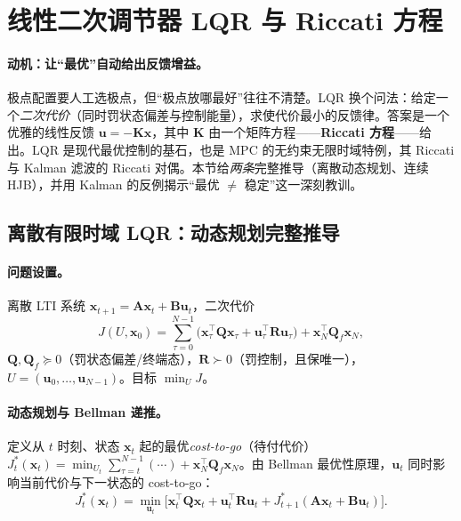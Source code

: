 \section{线性二次调节器 LQR 与 Riccati 方程}
\label{sec:ctrl-lqr}

\paragraph{动机：让“最优”自动给出反馈增益。}
极点配置要人工选极点，但“极点放哪最好”往往不清楚。LQR 换个问法：给定一个\emph{二次代价}（同时罚状态偏差与控制能量），求使代价最小的反馈律。答案是一个优雅的线性反馈 $\mathbf{u}=-\mathbf{K}\mathbf{x}$，其中 $\mathbf{K}$ 由一个矩阵方程——\textbf{Riccati 方程}——给出。LQR 是现代最优控制的基石，也是 MPC 的无约束无限时域特例，其 Riccati 与 Kalman 滤波的 Riccati 对偶。本节给\emph{两条}完整推导（离散动态规划、连续 HJB），并用 Kalman 的反例揭示“最优 $\ne$ 稳定”这一深刻教训。

\subsection{离散有限时域 LQR：动态规划完整推导}
\label{sec:ctrl-lqr-dp}

\paragraph{问题设置。}
离散 LTI 系统 $\mathbf{x}_{t+1}=\mathbf{A}\mathbf{x}_t+\mathbf{B}\mathbf{u}_t$，二次代价\cite{bansal2017lqr}
\begin{equation}
  J(U,\mathbf{x}_0)=\sum_{\tau=0}^{N-1}\big(\mathbf{x}_\tau^\top\mathbf{Q}\mathbf{x}_\tau+\mathbf{u}_\tau^\top\mathbf{R}\mathbf{u}_\tau\big)+\mathbf{x}_N^\top\mathbf{Q}_f\mathbf{x}_N,
  \label{eq:ctrl-lqr-cost}
\end{equation}
$\mathbf{Q},\mathbf{Q}_f\succeq0$（罚状态偏差/终端态），$\mathbf{R}\succ0$（罚控制，且保唯一），$U=(\mathbf{u}_0,\dots,\mathbf{u}_{N-1})$。目标 $\min_U J$。

\paragraph{动态规划与 Bellman 递推。}
定义从 $t$ 时刻、状态 $\mathbf{x}_t$ 起的最优\emph{cost-to-go}（待付代价）$J_t^*(\mathbf{x}_t)=\min_{U_t}\sum_{\tau=t}^{N-1}(\cdots)+\mathbf{x}_N^\top\mathbf{Q}_f\mathbf{x}_N$。由 Bellman 最优性原理，$\mathbf{u}_t$ 同时影响当前代价与下一状态的 cost-to-go\cite{bansal2017lqr}：
\begin{equation}
  J_t^*(\mathbf{x}_t)=\min_{\mathbf{u}_t}\Big[\mathbf{x}_t^\top\mathbf{Q}\mathbf{x}_t+\mathbf{u}_t^\top\mathbf{R}\mathbf{u}_t+J_{t+1}^*(\mathbf{A}\mathbf{x}_t+\mathbf{B}\mathbf{u}_t)\Big].
  \label{eq:ctrl-bellman}
\end{equation}

